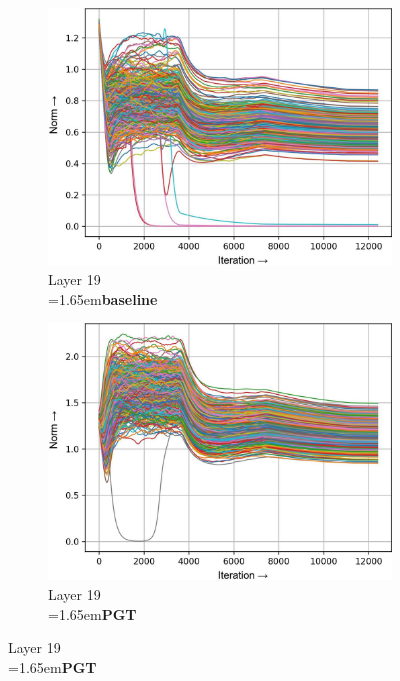\documentclass[runningheads]{llncs}
\newcommand{\forceindentb}{\parindent=1.65em\indent\parindent=0pt\relax}
\begin{document}
\begin{figure}[h]
\begin{subfigure}[t]{0.34\textwidth}
\includegraphics[width=\textwidth]{trimmed/baseline-w-layer-7-2}
\caption{Layer 19\\ \forceindentb\textbf{baseline}}
\end{subfigure}
\begin{subfigure}[t]{0.34\textwidth}
\includegraphics[width=\textwidth]{trimmed/pgt-w-layer-7-2}
\caption{Layer 19\\ \forceindentb\textbf{PGT}}
\end{subfigure}


\end{figure}
\end{document}
